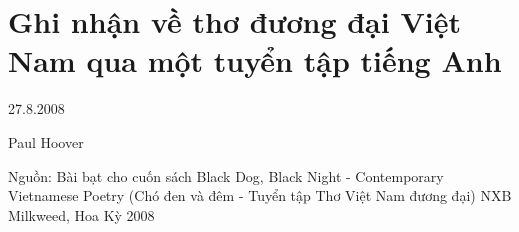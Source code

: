 \documentclass[../main.tex]{subfiles}
\begin{document}
\chapter{Ghi nhận về thơ đương đại Việt Nam qua một tuyển tập tiếng Anh}

\begin{metadata}

\begin{flushright}27.8.2008\end{flushright}

Paul Hoover

Nguồn: Bài bạt cho cuốn sách Black Dog, Black Night - Contemporary Vietnamese Poetry (Chó đen và đêm - Tuyển tập Thơ Việt Nam đương đại) NXB Milkweed, Hoa Kỳ 2008

\end{metadata}
\end{document}
